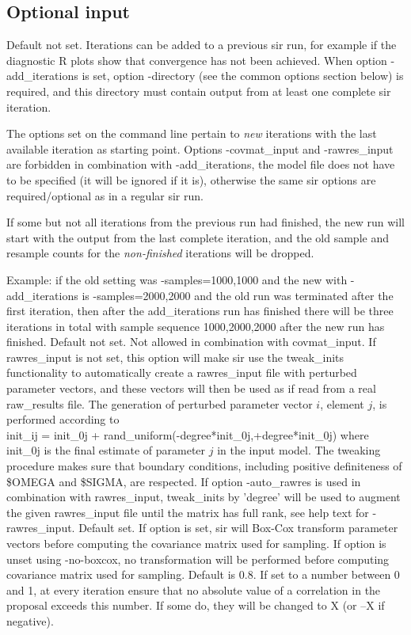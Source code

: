 \subsection{Optional input}
\begin{optionlist}
Default not set. Iterations can be added to a previous sir run, for example if the diagnostic R plots show that convergence has not been achieved. When option -add\_iterations is set, option -directory (see the common options section below) is required, and this directory must contain output from at least one complete sir iteration.
	
The options set on the command line	pertain to \emph{new} iterations with the last available iteration as starting point.
Options -covmat\_input and -rawres\_input are forbidden in combination with -add\_iterations, the model file does not have to be specified (it will be ignored if it is), otherwise the same sir options are required/optional as in a regular sir run.
	
If some but not all iterations from the previous run had finished, the new run will start with the output from the last complete iteration, and the old sample and resample counts for the \emph{non-finished} iterations will be dropped. 

Example: if the old setting was -samples=1000,1000 	and the new with -add\_iterations is -samples=2000,2000 and the old run was terminated after the first iteration, then after the add\_iterations run has finished there will be three iterations in total with sample sequence 1000,2000,2000 after the new run has finished.
\nextopt
{}
Default not set. Not allowed in combination with covmat\_input. If rawres\_input is not set, this option will make sir use the tweak\_inits functionality to automatically create a rawres\_input file with perturbed parameter vectors, and these vectors will then be used as if read from a real raw\_results file.	The generation of perturbed parameter vector $i$, element $j$, is performed according to\\
init\_ij = init\_0j + rand\_uniform(-degree*init\_0j,+degree*init\_0j) where init\_0j is the final estimate of parameter $j$ in the input model.	The tweaking procedure makes sure that boundary conditions, including positive definiteness of \$OMEGA and \$SIGMA, are respected.
If option -auto\_rawres is used	in combination with rawres\_input, tweak\_inits by 'degree' will be used to augment the given rawres\_input file until the matrix has full rank, see help text for -rawres\_input. 
\nextopt
{}
Default set. If option is set, sir will Box-Cox transform parameter vectors before computing the covariance matrix used for sampling. If option is unset using -no-boxcox, no transformation will be performed before computing covariance matrix
used for sampling.
\nextopt
{}
Default is 0.8. If set to a number between 0 and 1, at every iteration ensure that no absolute value of a correlation in the proposal exceeds this number. If some do, they will be changed to X (or –X if negative). 


\end{optionlist}
